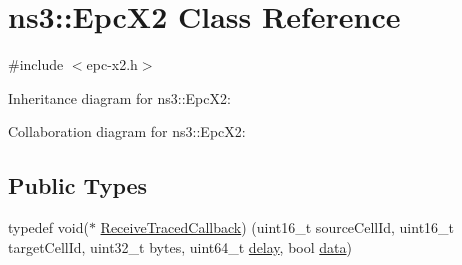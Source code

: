\hypertarget{classns3_1_1EpcX2}{}\section{ns3\+:\+:Epc\+X2 Class Reference}
\label{classns3_1_1EpcX2}


{\ttfamily \#include $<$epc-\/x2.\+h$>$}



Inheritance diagram for ns3\+:\+:Epc\+X2\+:


Collaboration diagram for ns3\+:\+:Epc\+X2\+:
\subsection*{Public Types}
\begin{DoxyCompactItemize}
\item 
typedef void($\ast$ \hyperlink{classns3_1_1EpcX2_ada91fb41804269c279b9214a6f36a0cd}{Receive\+Traced\+Callback}) (uint16\+\_\+t source\+Cell\+Id, uint16\+\_\+t target\+Cell\+Id, uint32\+\_\+t bytes, uint64\+\_\+t \hyperlink{mmwave_2model_2fading-traces_2fading__trace__generator_8m_a7964e6aa8f61a9d28973c8267a606ad8}{delay}, bool \hyperlink{topology-example-sim_8cc_a26c65296e316af77b787dc77469bb2a4}{data})
\end{DoxyCompactItemize}
